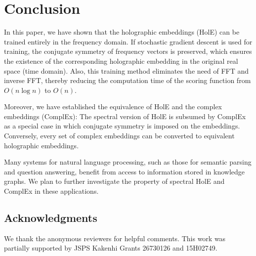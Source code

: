\documentclass[11pt,a4paper]{article}
\begin{document}
\section{Conclusion}
\label{sec:concl}

In this paper, we have shown that the holographic embeddings (HolE) can be
trained entirely in the frequency domain.
If stochastic gradient descent is used for training, the conjugate symmetry of frequency vectors
is preserved,
which ensures the existence of the corresponding holographic embedding in the original real space (time domain).
Also, this training method
eliminates the need of FFT and inverse FFT,
thereby reducing
the computation time of the scoring function from $O(n\log n)$ to $O(n)$.

Moreover, we have established the equivalence of HolE and
the complex embeddings (ComplEx):
The spectral version of HolE is subsumed by ComplEx as a special case in which
conjugate symmetry is imposed on the embeddings.
Conversely, every set of complex embeddings can be converted to equivalent holographic embeddings.

Many systems for natural language processing, such as those for semantic parsing and question answering, benefit from access to information
stored in knowledge graphs.
We plan to further investigate the property of spectral HolE and ComplEx in these applications.


\subsection*{Acknowledgments}

We thank the anonymous reviewers for helpful comments.
This work was partially supported by JSPS Kakenhi Grants 26730126 and 15H02749.
\end{document}
